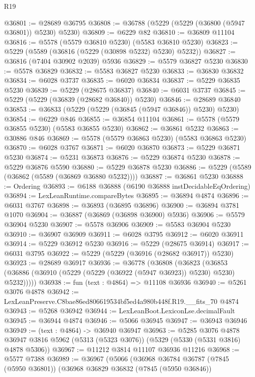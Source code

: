 \begin{lexlean}{R19}
\begin{coremodule}
@36801 := @28689 @36795
@36808 := @36788 (@5229 (@5229 (@36800 (@5947 @36801)) @5230) @5230)
@36809 := @6229 @82
@36810 := @36809 @11104
@36816 := @5578 (@5579 @36810 @5230) (@5583 @36810 @5230)
@36823 := @5229 (@5589 (@36816 (@5229 (@30898 @5232) @5230) @5232))
@36827 := @36816 (@7404 @30902 @2039) @5936
@36829 := @5579 @36827 @5230
@36830 := @5578 @36829
@36832 := @5583 @36827 @5230
@36833 := @36830 @36832
@36834 := @6028 @3737
@36835 := @6020 @36834
@36837 := @5229 @36835 @5230
@36839 := @5229 (@28675 @36837)
@36840 := @6031 @3737
@36845 := @5229 (@5229 (@36839 (@28682 @36840)) @5230)
@36846 := @28689 @36840
@36853 := @36833 (@5229 (@5229 (@36845 (@5947 @36846)) @5230) @5230)
@36854 := @6229 @846
@36855 := @36854 @11104
@36861 := @5578 (@5579 @36855 @5230) (@5583 @36855 @5230)
@36862 := @36861 @5232
@36863 := @30886 @846
@36869 := @5578 (@5579 @36863 @5230) (@5583 @36863 @5230)
@36870 := @6028 @3767
@36871 := @6020 @36870
@36873 := @5229 @36871 @5230
@36874 := @5231 @36873
@36876 := @5229 @36874 @5230
@36878 := @5229 @36876 @5590
@36880 := @5229 @36878 @5230
@36886 := @5229 (@5589 (@36862 (@5589 (@36869 @36880 @5232))))
@36887 := @36861 @5230
@36888 := Ordering
@36893 := @6188 @36888 (@6190 @36888 instDecidableEqOrdering)
@36894 := LexLeanRuntime.compareBytes
@36895 := @36894 @4874
@36896 := @6031 @3767
@36898 := @36893 (@36895 @36896)
@36900 := @36894 @3781 @1070
@36904 := @36887 (@36869 (@36898 @36900) @5936)
@36906 := @5579 @36904 @5230
@36907 := @5578 @36906
@36909 := @5583 @36904 @5230
@36910 := @36907 @36909
@36911 := @6028 @3795
@36912 := @6020 @36911
@36914 := @5229 @36912 @5230
@36916 := @5229 (@28675 @36914)
@36917 := @6031 @3795
@36922 := @5229 (@5229 (@36916 (@28682 @36917)) @5230)
@36923 := @28689 @36917
@36936 := @36778
    (@36808
      (@36823 (@36853 (@36886 (@36910 (@5229 (@5229 (@36922 (@5947 @36923)) @5230) @5230) @5232)))))
@36938 := fun (text : @4864) => @11108 @36936
@36940 := @5261 @3076 @4878
@36942 := LexLeanPreserve.C8bae86ed806619534bf5ed4a980b448f.R19.__fits_70 @4874
@36943 := @5268 @36942
@36944 := LexLeanBoot.LexiconLse.decimalFault
@36945 := @36944 @4874
@36946 := @5066 @36945
@36947 := @36943 @36946
@36949 := (text : @4864) -> @36940 @36947
@36963 := @5285
    @3076
    @4878
    @36947
    @3816
    @5962
    (@5313 (@5323 @3076))
    (@5329 (@5330 (@5331 @3816) @4878 @5306))
@36967 := @11212 @3814 @11107 @36936 @11216
@36968 := @5577 @7388
@36989 := @36967
    (@5066
      (@36968
        @36784
        @36787
        (@7845 (@5950 @36801))
        (@36968
          @36829
          @36832
          (@7845 (@5950 @36846))

\end{coremodule}
\end{lexlean}
